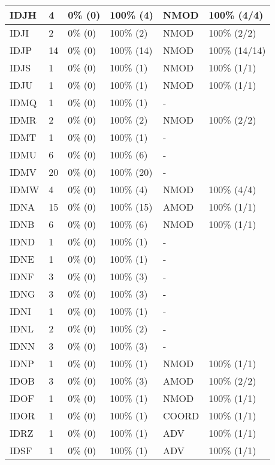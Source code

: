 \begin{figure*}
\begin{tabular}{|l|l|l|l||l|l|}
\hline
 IDJH & 4 & 0\% (0) & 100\% (4) & NMOD & 100\% (4/4) \\ 
\hline
 IDJI & 2 & 0\% (0) & 100\% (2) & NMOD & 100\% (2/2) \\ 
\hline
 IDJP & 14 & 0\% (0) & 100\% (14) & NMOD & 100\% (14/14) \\ 
\hline
 IDJS & 1 & 0\% (0) & 100\% (1) & NMOD & 100\% (1/1) \\ 
\hline
 IDJU & 1 & 0\% (0) & 100\% (1) & NMOD & 100\% (1/1) \\ 
\hline
 IDMQ & 1 & 0\% (0) & 100\% (1) & - &  \\ 
\hline
 IDMR & 2 & 0\% (0) & 100\% (2) & NMOD & 100\% (2/2) \\ 
\hline
 IDMT & 1 & 0\% (0) & 100\% (1) & - &  \\ 
\hline
 IDMU & 6 & 0\% (0) & 100\% (6) & - &  \\ 
\hline
 IDMV & 20 & 0\% (0) & 100\% (20) & - &  \\ 
\hline
 IDMW & 4 & 0\% (0) & 100\% (4) & NMOD & 100\% (4/4) \\ 
\hline
 IDNA & 15 & 0\% (0) & 100\% (15) & AMOD & 100\% (1/1) \\ 
\hline
 IDNB & 6 & 0\% (0) & 100\% (6) & NMOD & 100\% (1/1) \\ 
\hline
 IDND & 1 & 0\% (0) & 100\% (1) & - &  \\ 
\hline
 IDNE & 1 & 0\% (0) & 100\% (1) & - &  \\ 
\hline
 IDNF & 3 & 0\% (0) & 100\% (3) & - &  \\ 
\hline
 IDNG & 3 & 0\% (0) & 100\% (3) & - &  \\ 
\hline
 IDNI & 1 & 0\% (0) & 100\% (1) & - &  \\ 
\hline
 IDNL & 2 & 0\% (0) & 100\% (2) & - &  \\ 
\hline
 IDNN & 3 & 0\% (0) & 100\% (3) & - &  \\ 
\hline
 IDNP & 1 & 0\% (0) & 100\% (1) & NMOD & 100\% (1/1) \\ 
\hline
 IDOB & 3 & 0\% (0) & 100\% (3) & AMOD & 100\% (2/2) \\ 
\hline
 IDOF & 1 & 0\% (0) & 100\% (1) & NMOD & 100\% (1/1) \\ 
\hline
 IDOR & 1 & 0\% (0) & 100\% (1) & COORD & 100\% (1/1) \\ 
\hline
 IDRZ & 1 & 0\% (0) & 100\% (1) & ADV & 100\% (1/1) \\ 
\hline
 IDSF & 1 & 0\% (0) & 100\% (1) & ADV & 100\% (1/1) \\ 
\hline
\end{tabular}
\end{figure*}
